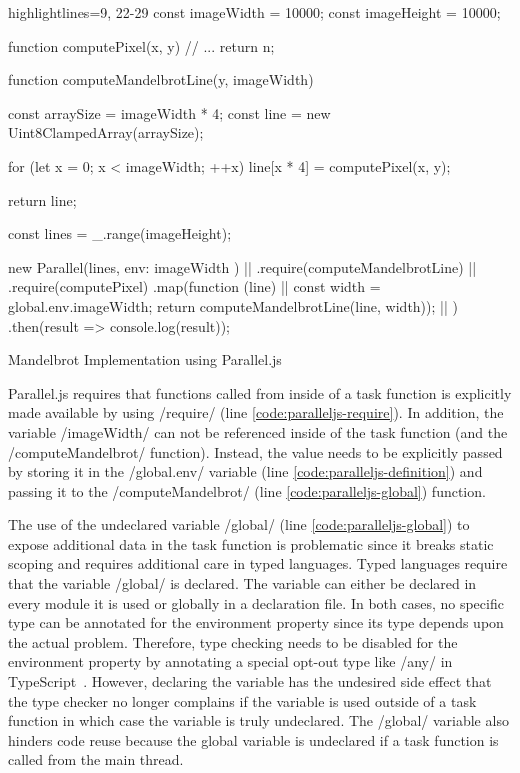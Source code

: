 \begin{listing}
	\begin{javascriptcode*}{highlightlines={9, 22-29}}
const imageWidth = 10000;
const imageHeight = 10000;

function computePixel(x, y) {
	// ...
	return n;
}

function computeMandelbrotLine(y, imageWidth) {
	const arraySize = imageWidth * 4;
	const line = new Uint8ClampedArray(arraySize);
	
	for (let x = 0; x < imageWidth; ++x) {
		line[x * 4] = computePixel(x, y);
	}
	
	return line;
}

const lines = _.range(imageHeight);

new Parallel(lines, {env: { imageWidth } }) |$\label{code:paralleljs-definition}$|
	.require(computeMandelbrotLine) |$\label{code:paralleljs-require}$|
	.require(computePixel)
	.map(function (line) { |$\label{code:paralleljs-map}$|
		const width = global.env.imageWidth;
		return computeMandelbrotLine(line, width)); |$\label{code:paralleljs-global}$|
	})
	.then(result => console.log(result));
\end{javascriptcode*}

\caption{Mandelbrot Implementation using Parallel.js}
\label{fig:mandelbrot-paralleljs}
\end{listing}

Parallel.js requires that functions called from inside of a task function is explicitly made available by using \javascriptinline/require/ (line \ref{code:paralleljs-require}). In addition, the variable \javascriptinline/imageWidth/ can not be referenced inside of the task function (and the \javascriptinline/computeMandelbrot/ function). Instead, the value needs to be explicitly passed by storing it in the \javascriptinline/global.env/ variable (line \ref{code:paralleljs-definition}) and passing it to the \javascriptinline/computeMandelbrot/ (line \ref{code:paralleljs-global}) function.


The use of the undeclared variable \javascriptinline/global/ (line \ref{code:paralleljs-global}) to expose additional data in the task function is problematic since it breaks static scoping and requires additional care in typed languages. Typed languages require that the variable \javascriptinline/global/ is declared. The variable can either be declared in every module it is used or globally in a declaration file. In both cases, no specific type can be annotated for the environment property since its type depends upon the actual problem. Therefore, type checking needs to be disabled for the environment property by annotating a special opt-out type like \javascriptinline/any/ in TypeScript~\cite{typescript}. However, declaring the variable has the undesired side effect that the type checker no longer complains if the variable is used outside of a task function in which case the variable is truly undeclared. The \javascriptinline/global/ variable also hinders code reuse because the global variable is undeclared if a task function is called from the main thread.

